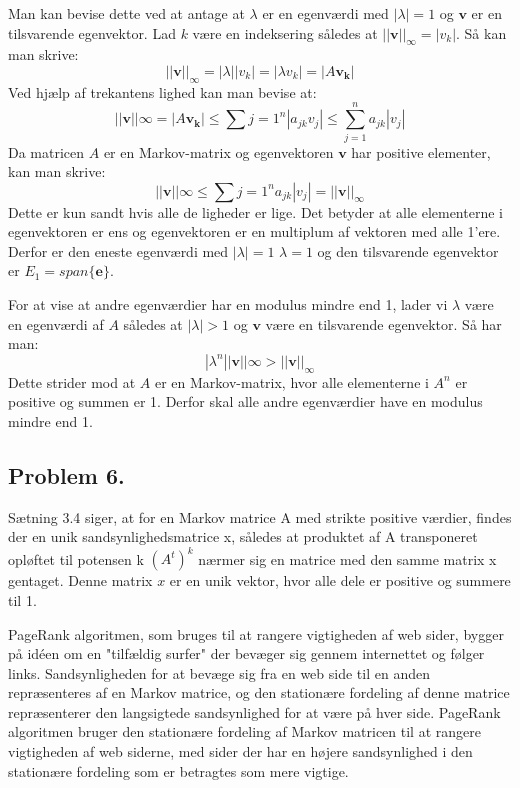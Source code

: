 Man kan bevise dette ved at antage at $\lambda$ er en egenværdi med $|\lambda| = 1$ og $\mathbf{v}$ er en tilsvarende egenvektor. Lad $k$ være en indeksering således at $||\mathbf{v}||_\infty = |v_k|$. Så kan man skrive:
$$||\mathbf{v}||_\infty = |\lambda ||v_k| = |\lambda v_k| = |A\mathbf{v_k}|$$
Ved hjælp af trekantens lighed kan man bevise at:
$$||\mathbf{v}||\infty = |A\mathbf{v_k}| \leq \sum{j=1}^n |a_{jk} v_j| \leq \sum_{j=1}^n a_{jk} |v_j|$$
Da matricen $A$ er en Markov-matrix og egenvektoren $\mathbf{v}$ har positive elementer, kan man skrive:
$$||\mathbf{v}||\infty \leq \sum{j=1}^n a_{jk} |v_j| = ||\mathbf{v}||_\infty$$
Dette er kun sandt hvis alle de ligheder er lige. Det betyder at alle elementerne i egenvektoren er ens og egenvektoren er en multiplum af vektoren med alle 1'ere. Derfor er den eneste egenværdi med $|\lambda| = 1$ $\lambda = 1$ og den tilsvarende egenvektor er $E_1 = span \{\mathbf{e}\}$.

For at vise at andre egenværdier har en modulus mindre end 1, lader vi $\lambda$ være en egenværdi af $A$ således at $|\lambda| > 1$ og $\mathbf{v}$ være en tilsvarende egenvektor. Så har man:
$$|\lambda^n||\mathbf{v}||\infty > ||\mathbf{v}||_\infty$$
Dette strider mod at $A$ er en Markov-matrix, hvor alle elementerne i $A^n$ er positive og summen er 1. Derfor skal alle andre egenværdier have en modulus mindre end 1.


\subsection*{Problem 6.}

Sætning 3.4 siger, at for en Markov matrice A med strikte positive værdier, findes der en unik sandsynlighedsmatrice x, således at produktet af A transponeret opløftet til potensen k $(A^t)^k$ nærmer sig en matrice med den samme matrix x gentaget. Denne matrix $x$ er en unik vektor, hvor alle dele er positive og summere til 1.

PageRank algoritmen, som bruges til at rangere vigtigheden af web sider, bygger på idéen om en "tilfældig surfer" der bevæger sig gennem internettet og følger links. Sandsynligheden for at bevæge sig fra en web side til en anden repræsenteres af en Markov matrice, og den stationære fordeling af denne matrice repræsenterer den langsigtede sandsynlighed for at være på hver side. PageRank algoritmen bruger den stationære fordeling af Markov matricen til at rangere vigtigheden af web siderne, med sider der har en højere sandsynlighed i den stationære fordeling som er betragtes som mere vigtige.

